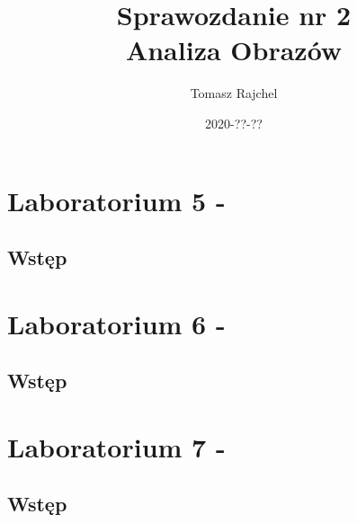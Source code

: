 \documentclass{article}
\title{Sprawozdanie nr 2\\Analiza Obrazów}
\date{2020-??-??}
\author{Tomasz Rajchel}
\begin{document}
	\maketitle

	\tableofcontents
	\newpage
	
	\section{Laboratorium 5 - }
	\subsection{Wstęp}
	
	\section{Laboratorium 6 - }
	\subsection{Wstęp}
	
	\section{Laboratorium 7 - }
	\subsection{Wstęp}
	
\end{document}

